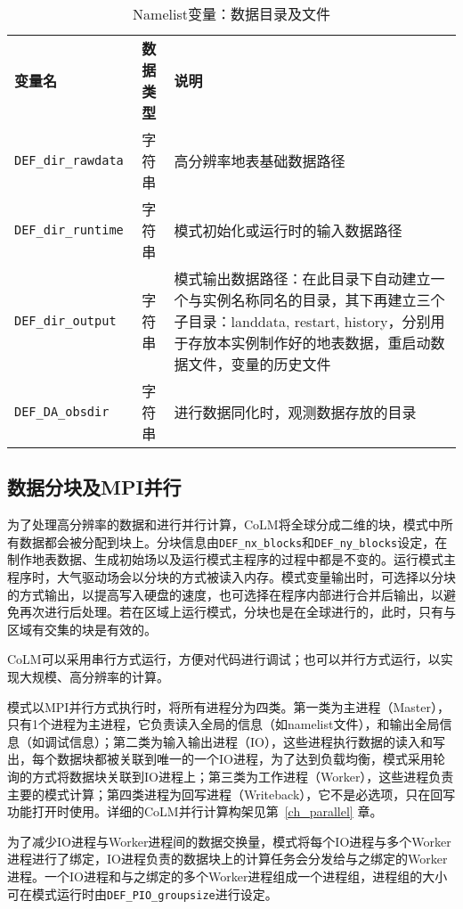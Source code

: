 \begin{table}[!htbp] \small
\caption{Namelist变量：数据目录及文件} \label{table_nl_dir_file}
\centering \renewcommand{\arraystretch}{1.2}
\begin{tabular}{lcp{}}
\toprule
\textbf{变量名} & \textbf{数据类型} & \textbf{说明} \\
\texttt{DEF\_dir\_rawdata} & 字符串 & 高分辨率地表基础数据路径 \\
\texttt{DEF\_dir\_runtime} & 字符串 & 模式初始化或运行时的输入数据路径 \\
\texttt{DEF\_dir\_output} & 字符串 & 模式输出数据路径：在此目录下自动建立一个与实例名称同名的目录，其下再建立三个子目录：landdata, restart, history，分别用于存放本实例制作好的地表数据，重启动数据文件，变量的历史文件 \\
\texttt{DEF\_DA\_obsdir} & 字符串 & 进行数据同化时，观测数据存放的目录 \\
\bottomrule
\end{tabular}
\end{table}

\subsection{数据分块及MPI并行}

为了处理高分辨率的数据和进行并行计算，CoLM将全球分成二维的块，模式中所有数据都会被分配到块上。分块信息由\texttt{DEF\_nx\_blocks}和\texttt{DEF\_ny\_blocks}设定，在制作地表数据、生成初始场以及运行模式主程序的过程中都是不变的。运行模式主程序时，大气驱动场会以分块的方式被读入内存。模式变量输出时，可选择以分块的方式输出，以提高写入硬盘的速度，也可选择在程序内部进行合并后输出，以避免再次进行后处理。若在区域上运行模式，分块也是在全球进行的，此时，只有与区域有交集的块是有效的。

CoLM可以采用串行方式运行，方便对代码进行调试；也可以并行方式运行，以实现大规模、高分辨率的计算。

模式以MPI并行方式执行时，将所有进程分为四类。第一类为主进程（Master），只有1个进程为主进程，它负责读入全局的信息（如namelist文件），和输出全局信息（如调试信息）；第二类为输入输出进程（IO），这些进程执行数据的读入和写出，每个数据块都被关联到唯一的一个IO进程，为了达到负载均衡，模式采用轮询的方式将数据块关联到IO进程上；第三类为工作进程（Worker），这些进程负责主要的模式计算；第四类进程为回写进程（Writeback），它不是必选项，只在回写功能打开时使用。详细的CoLM并行计算构架见第~\ref{ch_parallel} 章。

为了减少IO进程与Worker进程间的数据交换量，模式将每个IO进程与多个Worker进程进行了绑定，IO进程负责的数据块上的计算任务会分发给与之绑定的Worker进程。一个IO进程和与之绑定的多个Worker进程组成一个进程组，进程组的大小可在模式运行时由\texttt{DEF\_PIO\_groupsize}进行设定。


